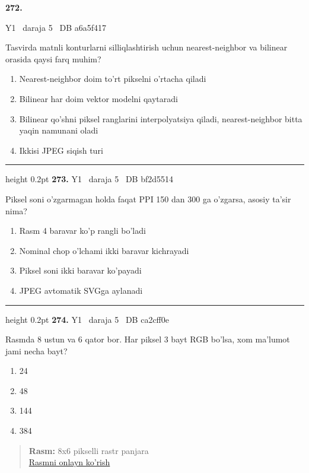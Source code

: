 \documentclass[10pt,a4paper,oneside]{article}
\begin{document}
\hypertarget{q272}{\textbf{\color{ink}272.}}  {\color{muted}\scriptsize Y1 \textbullet\ daraja 5 \textbullet\ DB a6a5f417}
\par
Tasvirda matnli konturlarni silliqlashtirish uchun nearest-neighbor va bilinear orasida qaysi farq muhim?
\begin{enumerate}[label=\Alph*),leftmargin=9mm]
\item Nearest-neighbor doim to'rt pikselni o'rtacha qiladi
\item Bilinear har doim vektor modelni qaytaradi
\item Bilinear qo'shni piksel ranglarini interpolyatsiya qiladi, nearest-neighbor bitta yaqin namunani oladi
\item Ikkisi JPEG siqish turi
\end{enumerate}
\vspace{2mm}\hrule height 0.2pt \vspace{4mm}
\hypertarget{q273}{\textbf{\color{ink}273.}}  {\color{muted}\scriptsize Y1 \textbullet\ daraja 5 \textbullet\ DB bf2d5514}
\par
Piksel soni o'zgarmagan holda faqat PPI 150 dan 300 ga o'zgarsa, asosiy ta'sir nima?
\begin{enumerate}[label=\Alph*),leftmargin=9mm]
\item Rasm 4 baravar ko'p rangli bo'ladi
\item Nominal chop o'lchami ikki baravar kichrayadi
\item Piksel soni ikki baravar ko'payadi
\item JPEG avtomatik SVGga aylanadi
\end{enumerate}
\vspace{2mm}\hrule height 0.2pt \vspace{4mm}
\hypertarget{q274}{\textbf{\color{ink}274.}}  {\color{muted}\scriptsize Y1 \textbullet\ daraja 5 \textbullet\ DB ca2cff0e}
\par
Rasmda 8 ustun va 6 qator bor. Har piksel 3 bayt RGB bo'lsa, xom ma'lumot jami necha bayt?
\begin{enumerate}[label=\Alph*),leftmargin=9mm]
\item 24
\item 48
\item 144
\item 384
\end{enumerate}
\begin{quote}\footnotesize\color{muted}\textbf{Rasm:} 8x6 pikselli rastr panjara\\
\href{https://github.com/sarvar9417/attestatsiya/blob/main/public/graphics-web-v2/raster_grid.svg}{Rasmni onlayn ko'rish}
\end{quote}
\end{document}
